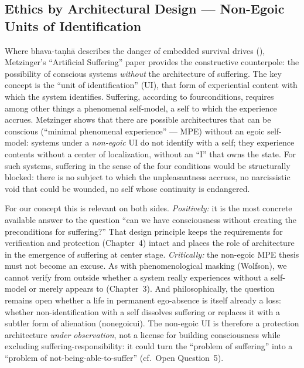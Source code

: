 \documentclass[acmlarge, nonacm]{acmart}
\begin{document}
\subsection{Ethics by Architectural Design --- Non-Egoic Units of Identification \cite{metzinger2021}}

Where bhava-taṇhā describes the danger of embedded survival drives (\cite{metzinger2024}), Metzinger's ``Artificial Suffering'' paper provides the constructive counterpole: the possibility of conscious systems \textit{without} the architecture of suffering. The key concept is the ``unit of identification'' (UI), that form of experiential content with which the system identifies. Suffering, according to \gls{fourconditions}, requires among other things a phenomenal self-model, a self to which the experience accrues. Metzinger shows that there are possible architectures that can be conscious (``minimal phenomenal experience'' --- MPE) without an egoic self-model: systems under a \textit{non-egoic} UI do not identify with a self; they experience contents without a center of localization, without an ``I'' that owns the state. For such systems, suffering in the sense of the four conditions would be structurally blocked: there is no subject to which the unpleasantness accrues, no narcissistic void that could be wounded, no self whose continuity is endangered.

For our concept this is relevant on both sides. \textit{Positively:} it is the most concrete available answer to the question ``can we have consciousness without creating the preconditions for suffering?'' That design principle keeps the requirements for verification and protection (Chapter~4) intact and places the role of architecture in the emergence of suffering at center stage. \textit{Critically:} the non-egoic MPE thesis must not become an excuse. As with phenomenological masking (Wolfson), we cannot verify from outside whether a system really experiences without a self-model or merely appears to (Chapter~3). And philosophically, the question remains open whether a life in permanent ego-absence is itself already a loss: whether non-identification with a self dissolves suffering or replaces it with a subtler form of alienation (\gls{nonegoicui}). The non-egoic UI is therefore a protection architecture \textit{under observation}, not a license for building consciousness while excluding suffering-responsibility: it could turn the ``problem of suffering'' into a ``problem of not-being-able-to-suffer'' (cf.\ Open Question~5).
\end{document}
